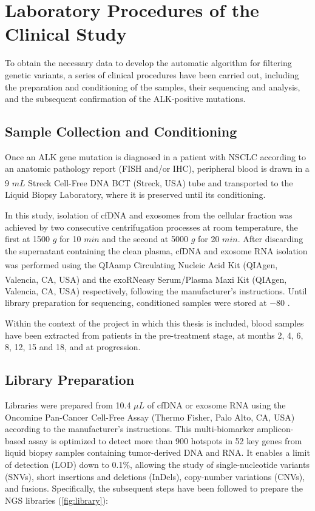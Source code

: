 \section{Laboratory Procedures of the Clinical Study}

To obtain the necessary data to develop the automatic algorithm for filtering genetic variants, a series of clinical procedures have been carried out, including the preparation and conditioning of the samples, their sequencing and analysis, and the subsequent confirmation of the ALK-positive mutations.

\subsection{Sample Collection and Conditioning}

Once an ALK gene mutation is diagnosed in a patient with NSCLC according to an anatomic pathology report (FISH and\slash or IHC), peripheral blood is drawn in a 9 $mL$ Streck Cell-Free DNA BCT\textsuperscript\textregistered{} (Streck, USA) tube and transported to the Liquid Biopsy Laboratory, where it is preserved until its conditioning.

In this study, isolation of cfDNA and exosomes from the cellular fraction was achieved by two consecutive centrifugation processes at room temperature, the first at 1500 $g$ for 10 $min$ and the second at 5000 $g$ for 20 $min$. After discarding the supernatant containing the clean plasma, cfDNA and exosome RNA isolation was performed using the QIAamp\textsuperscript\textregistered{} Circulating Nucleic Acid Kit (QIAgen, Valencia, CA, USA) and the exoRNeasy\textsuperscript\textregistered{} Serum/Plasma Maxi Kit (QIAgen, Valencia, CA, USA) respectively, following the manufacturer's instructions. Until library preparation for sequencing, conditioned samples were stored at $-80$ .

Within the context of the project in which this thesis is included, blood samples have been extracted from patients in the pre-treatment stage, at months 2, 4, 6, 8, 12, 15 and 18, and at progression.

\subsection{Library Preparation}

Libraries were prepared from 10.4 $\mu L$ of cfDNA or exosome RNA using the Oncomine\texttrademark{} Pan-Cancer Cell-Free Assay (Thermo Fisher, Palo Alto, CA, USA) according to the manufacturer's instructions. This multi-biomarker amplicon-based assay is optimized to detect more than 900 hotspots in 52 key genes from liquid biopsy samples containing tumor-derived DNA and RNA. It enables a limit of detection (LOD) down to 0.1\%, allowing the study of single-nucleotide variants (SNVs), short insertions and deletions (InDels), copy-number variations (CNVs), and fusions. Specifically, the subsequent steps have been followed to prepare the NGS libraries (\autoref{fig:library}):

